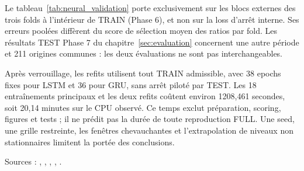 

Le tableau~\ref{tab:neural_validation} porte exclusivement sur les blocs externes des trois folds à l’intérieur de TRAIN (Phase 6), et non sur la loss d’arrêt interne. Ses erreurs poolées diffèrent du score de sélection moyen des ratios par fold. Les résultats TEST Phase 7 du chapitre~\ref{sec:evaluation} concernent une autre période et 211 origines communes : les deux évaluations ne sont pas interchangeables.



Après verrouillage, les refits utilisent tout TRAIN admissible, avec 38 epochs fixes pour LSTM et 36 pour GRU, sans arrêt piloté par TEST. Les 18 entraînements principaux et les deux refits coûtent environ 1208,461 secondes, soit 20,14 minutes sur le CPU observé. Ce temps exclut préparation, scoring, figures et tests ; il ne prédit pas la durée de toute reproduction FULL. Une seed, une grille restreinte, les fenêtres chevauchantes et l’extrapolation de niveaux non stationnaires limitent la portée des conclusions.



Sources : , , , , .


